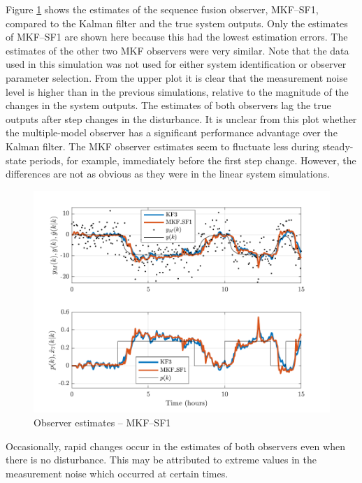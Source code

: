 Figure \ref{fig:grind1_rod_obs_est_MKF_SF1} shows the estimates of the sequence fusion observer, MKF--SF1, compared to the Kalman filter and the true system outputs. Only the estimates of MKF--SF1 are shown here because this had the lowest estimation errors. The estimates of the other two MKF observers were very similar. Note that the data used in this simulation was not used for either system identification or observer parameter selection. From the upper plot it is clear that the measurement noise level is higher than in the previous simulations, relative to the magnitude of the changes in the system outputs. The estimates of both observers lag the true outputs after step changes in the disturbance. It is unclear from this plot whether the multiple-model observer has a significant performance advantage over the Kalman filter. The \gls{MKF} observer estimates seem to fluctuate less during steady-state periods, for example, immediately before the first step change. However, the differences are not as obvious as they were in the linear system simulations.
\begin{figure}[htp]
	\centering
	\includegraphics[width=13cm]{images/grind1_rod_obs_sim_3_est_MKF_SF1.pdf}
	\caption{Observer estimates -- MKF--SF1}
	\label{fig:grind1_rod_obs_est_MKF_SF1}
\end{figure}
Occasionally, rapid changes occur in the estimates of both observers even when there is no disturbance. This may be attributed to extreme values in the measurement noise which occurred at certain times.

